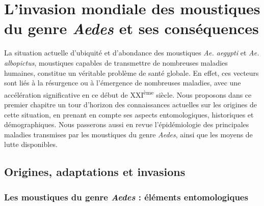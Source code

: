 \chapter[L'invasion mondiale des moustiques du genre {\em Aedes}]{L'invasion mondiale des moustiques du genre {\em Aedes} et ses conséquences}
\chaptermark{}

La situation actuelle d'ubiquité et d'abondance des moustiques {\em Ae. aegypti} et {\em Ae. albopictus}, moustiques capables de transmettre de nombreuses maladies humaines, constitue un véritable problème de santé globale. 
En effet, ces vecteurs sont liés à la résurgence ou à l'émergence de nombreuses maladies, avec une accélération significative en ce début de XXI\textsuperscript{ème} siècle.
Nous proposons dans ce premier chapitre un tour d'horizon des connaissances actuelles sur les origines de cette situation, en prenant en compte ses aspects entomologiques, historiques et démographiques.
Nous passerons aussi en revue l'épidémiologie des principales maladies transmises par les moustiques du genre {\em Aedes}, ainsi que les moyens de lutte disponibles.

\section[Origines, adaptations \& invasions]{Origines, adaptations et invasions}

\subsection{Les moustiques du genre {\em Aedes} : éléments entomologiques}

